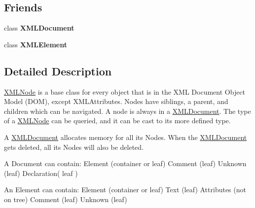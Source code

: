 \subsection*{Friends}
\begin{DoxyCompactItemize}
\item 
\hypertarget{classtinyxml2_1_1_x_m_l_node_a4eee3bda60c60a30e4e8cd4ea91c4c6e}{class {\bfseries X\-M\-L\-Document}}\label{classtinyxml2_1_1_x_m_l_node_a4eee3bda60c60a30e4e8cd4ea91c4c6e}

\item 
\hypertarget{classtinyxml2_1_1_x_m_l_node_ac2fba9b6e452829dd892f7392c24e0eb}{class {\bfseries X\-M\-L\-Element}}\label{classtinyxml2_1_1_x_m_l_node_ac2fba9b6e452829dd892f7392c24e0eb}

\end{DoxyCompactItemize}


\subsection{Detailed Description}
\hyperlink{classtinyxml2_1_1_x_m_l_node}{X\-M\-L\-Node} is a base class for every object that is in the X\-M\-L Document Object Model (D\-O\-M), except X\-M\-L\-Attributes. Nodes have siblings, a parent, and children which can be navigated. A node is always in a \hyperlink{classtinyxml2_1_1_x_m_l_document}{X\-M\-L\-Document}. The type of a \hyperlink{classtinyxml2_1_1_x_m_l_node}{X\-M\-L\-Node} can be queried, and it can be cast to its more defined type.

A \hyperlink{classtinyxml2_1_1_x_m_l_document}{X\-M\-L\-Document} allocates memory for all its Nodes. When the \hyperlink{classtinyxml2_1_1_x_m_l_document}{X\-M\-L\-Document} gets deleted, all its Nodes will also be deleted.

\begin{DoxyVerb}A Document can contain: Element (container or leaf)
                        Comment (leaf)
                        Unknown (leaf)
                        Declaration( leaf )

An Element can contain: Element (container or leaf)
                        Text    (leaf)
                        Attributes (not on tree)
                        Comment (leaf)
                        Unknown (leaf)\end{DoxyVerb}
 

